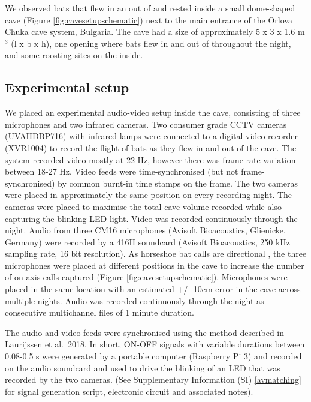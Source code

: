 \documentclass[
]{book}
\begin{document}
We observed bats that flew in an out of and rested inside a small dome-shaped cave (Figure \ref{fig:cavesetupschematic}) next to the main entrance of the Orlova Chuka cave system, Bulgaria. The cave had a size of approximately 5 x 3 x 1.6 m\(^{3}\) (l x b x h), one opening where bats flew in and out of throughout the night, and some roosting sites on the inside.

\hypertarget{experimental-setup}{%
\subsection{Experimental setup}\label{experimental-setup}}

We placed an experimental audio-video setup inside the cave, consisting of three microphones and two infrared cameras. Two consumer grade CCTV cameras (UVAHDBP716) with infrared lamps were connected to a digital video recorder (XVR1004) to record the flight of bats as they flew in and out of the cave. The system recorded video
mostly at 22 Hz, however there was frame rate variation between 18-27 Hz. Video feeds were time-synchronised (but not frame-synchronised) by common burnt-in time stamps on the frame. The two cameras were placed in approximately the same position on every recording night. The cameras were placed to maximise the total cave volume recorded
while also capturing the blinking LED light. Video was recorded continuously through the night. Audio from three CM16 microphones (Avisoft Bioacoustics, Glienicke, Germany) were recorded by a 416H soundcard (Avisoft Bioacoustics, 250 kHz sampling rate, 16 bit resolution). As horseshoe bat calls are directional \citep{matsuta2013adaptive}, the three microphones were placed at different positions in the cave to increase the number of on-axis calls captured (Figure \ref{fig:cavesetupschematic}). Microphones were placed in the same location with an estimated +/- 10cm error in the cave across multiple nights. Audio was recorded continuously through the night as consecutive multichannel files of 1 minute duration.

The audio and video feeds were synchronised using the method described in Laurijssen et al.~2018. In short, ON-OFF signals with variable durations between 0.08-0.5 s were generated by a portable computer (Raspberry Pi 3) and recorded on the audio soundcard and used to drive the blinking of an LED that was recorded by the two cameras. (See Supplementary Information (SI) \ref{avmatching} for signal generation script, electronic circuit and
associated notes).
\end{document}
